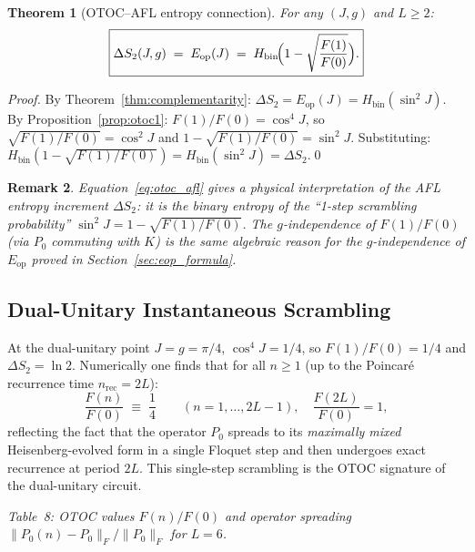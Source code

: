 \documentclass[12pt,a4paper]{article}
\newtheorem{theorem}{Theorem}[section]
\newtheorem{remark}[theorem]{Remark}
\begin{document}
\begin{theorem}[OTOC–AFL entropy connection]\label{thm:otoc_afl}
For any $(J,g)$ and $L\ge 2$:
\begin{equation}\label{eq:otoc_afl}
  \boxed{\Delta S_2(J,g)
  \;=\; E_\mathrm{op}(J)
  \;=\; H_\mathrm{bin}\!\Bigl(1 - \sqrt{\frac{F(1)}{F(0)}}\Bigr).}
\end{equation}
\end{theorem}

\begin{proof}
By Theorem~\ref{thm:complementarity}: $\Delta S_2 = E_\mathrm{op}(J) = H_\mathrm{bin}(\sin^2\!J)$.
By Proposition~\ref{prop:otoc1}: $F(1)/F(0) = \cos^4\!J$, so $\sqrt{F(1)/F(0)} = \cos^2\!J$
and $1 - \sqrt{F(1)/F(0)} = \sin^2\!J$.
Substituting: $H_\mathrm{bin}(1-\sqrt{F(1)/F(0)}) = H_\mathrm{bin}(\sin^2\!J) = \Delta S_2$.\qed
\end{proof}

\begin{remark}
Equation~\eqref{eq:otoc_afl} gives a \emph{physical interpretation} of the AFL
entropy increment $\Delta S_2$: it is the binary entropy of the ``1-step
scrambling probability'' $\sin^2 J = 1 - \sqrt{F(1)/F(0)}$.  The $g$-independence
of $F(1)/F(0)$ (via $P_0$ commuting with $K$) is the same algebraic reason for the
$g$-independence of $E_\mathrm{op}$ proved in Section~\ref{sec:eop_formula}.
\end{remark}

\subsection{Dual-Unitary Instantaneous Scrambling}

At the dual-unitary point $J=g=\pi/4$, $\cos^4\!J = 1/4$, so
$F(1)/F(0) = 1/4$ and $\Delta S_2 = \ln 2$.  Numerically one finds that for
all $n\ge 1$ (up to the Poincaré recurrence time $n_\mathrm{rec} = 2L$):
\begin{equation}\label{eq:du_otoc}
  \frac{F(n)}{F(0)} \;\equiv\; \frac{1}{4} \qquad (n=1,\ldots,2L-1),\quad
  \frac{F(2L)}{F(0)} = 1,
\end{equation}
reflecting the fact that the operator $P_0$ spreads to its \emph{maximally mixed}
Heisenberg-evolved form in a single Floquet step and then undergoes exact
recurrence at period $2L$.  This single-step scrambling is the OTOC signature of
the dual-unitary circuit.

\noindent\textit{Table~8: OTOC values $F(n)/F(0)$ and operator spreading
$\|P_0(n)-P_0\|_F / \|P_0\|_F$ for $L=6$.}
\end{document}
